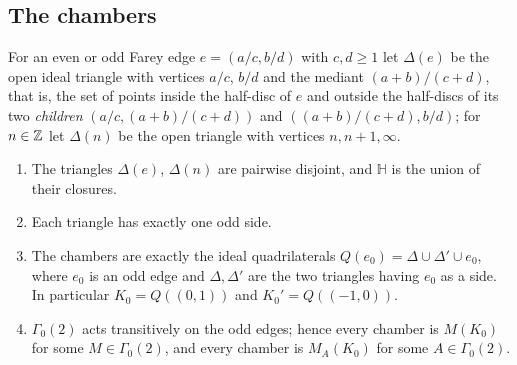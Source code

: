 \subsection{The chambers}
For an even or odd Farey edge $e=(a/c,b/d)$ with $c,d\ge1$ let $\Delta(e)$ be the open ideal triangle with vertices $a/c$, $b/d$ and the mediant $(a+b)/(c+d)$, that is, the set of points inside the half-disc of $e$ and outside the half-discs of its two \emph{children} $(a/c,(a+b)/(c+d))$ and $((a+b)/(c+d),b/d)$; for $n\in\mathbb{Z}$ let $\Delta(n)$ be the open triangle with vertices $n,n+1,\infty$.

\begin{lemma}\label{lem:tess}
\begin{enumerate}
\item[(i)] The triangles $\Delta(e)$, $\Delta(n)$ are pairwise disjoint, and $\mathbb H$ is the union of their closures.
\item[(ii)] Each triangle has exactly one odd side.
\item[(iii)] The chambers are exactly the ideal quadrilaterals $Q(e_0)=\Delta\cup\Delta'\cup e_0$, where $e_0$ is an odd edge and $\Delta,\Delta'$ are the two triangles having $e_0$ as a side. In particular $K_0=Q((0,1))$ and $K_0'=Q((-1,0))$.
\item[(iv)] $\Gamma_0(2)$ acts transitively on the odd edges; hence every chamber is $M(K_0)$ for some $M\in\Gamma_0(2)$, and every chamber is $M_A(K_0)$ for some $A\in\Gamma_0(2)$.
\end{enumerate}
\end{lemma}


